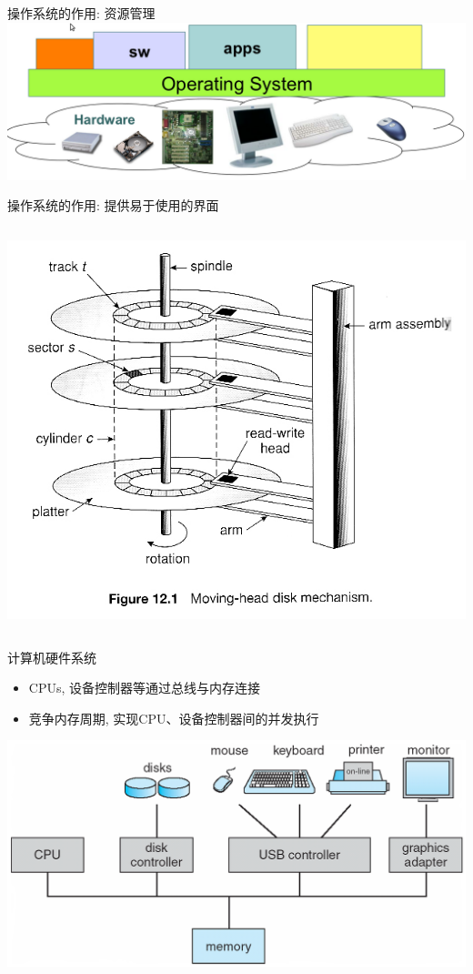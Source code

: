 \documentclass[xcolor=svgnames]{beamer}
\begin{document}
\begin{CJK*}{UTF8}{gbsn}
\begin{frame}{操作系统的作用: 资源管理}
\includegraphics[width=1.0\textwidth]{os-function.png}
\end{frame}

\begin{frame}{操作系统的作用: 提供易于使用的界面}
\begin{columns}
\includegraphics[width=1.0\textwidth]{disk.jpg}
\end{columns}
\end{frame}

\begin{frame}{计算机硬件系统}
\begin{itemize}
\item CPUs, 设备控制器等通过总线与内存连接
\item 竞争内存周期, 实现CPU、设备控制器间的并发执行
\end{itemize}
\includegraphics[width=1.0\textwidth]{org.png}
\end{frame}


\end{CJK*}
\end{document}
